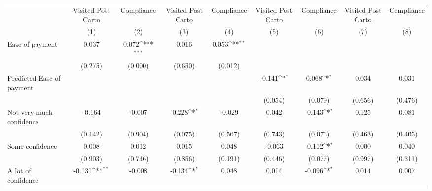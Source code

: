 {
\def\sym#1{\ifmmode^{#1}\else\(^{#1}\)\fi}
\begin{tabular}{l*{8}{c}}
\hline\hline
                &\multicolumn{1}{c}{Visited Post Carto}&\multicolumn{1}{c}{Compliance}&\multicolumn{1}{c}{Visited Post Carto}&\multicolumn{1}{c}{Compliance}&\multicolumn{1}{c}{Visited Post Carto}&\multicolumn{1}{c}{Compliance}&\multicolumn{1}{c}{Visited Post Carto}&\multicolumn{1}{c}{Compliance}\\
                &\multicolumn{1}{c}{(1)}         &\multicolumn{1}{c}{(2)}         &\multicolumn{1}{c}{(3)}         &\multicolumn{1}{c}{(4)}         &\multicolumn{1}{c}{(5)}         &\multicolumn{1}{c}{(6)}         &\multicolumn{1}{c}{(7)}         &\multicolumn{1}{c}{(8)}         \\
\hline
Ease of payment &    0.037         &    0.072\sym{***}&    0.016         &    0.053\sym{**} &                  &                  &                  &                  \\
                &  (0.275)         &  (0.000)         &  (0.650)         &  (0.012)         &                  &                  &                  &                  \\
Predicted Ease of payment&                  &                  &                  &                  &   -0.141\sym{*}  &    0.068\sym{*}  &    0.034         &    0.031         \\
                &                  &                  &                  &                  &  (0.054)         &  (0.079)         &  (0.656)         &  (0.476)         \\
Not very much confidence&   -0.164         &   -0.007         &   -0.228\sym{*}  &   -0.029         &    0.042         &   -0.143\sym{*}  &    0.125         &    0.081         \\
                &  (0.142)         &  (0.904)         &  (0.075)         &  (0.507)         &  (0.743)         &  (0.076)         &  (0.463)         &  (0.405)         \\
Some confidence &    0.008         &    0.012         &    0.015         &    0.048         &   -0.063         &   -0.112\sym{*}  &    0.000         &    0.040         \\
                &  (0.903)         &  (0.746)         &  (0.856)         &  (0.191)         &  (0.446)         &  (0.077)         &  (0.997)         &  (0.311)         \\
A lot of confidence&   -0.131\sym{**} &   -0.008         &   -0.134\sym{*}  &    0.048         &    0.014         &   -0.096\sym{*}  &    0.014         &    0.007         \\

\end{tabular}}
